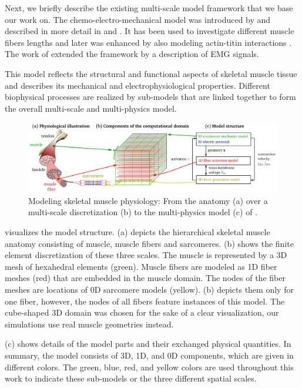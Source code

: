 Next, we briefly describe the existing multi-scale model framework that we base our work on.
The chemo-electro-mechanical model was introduced by \cite{Roehrle2012} and described in more detail in \cite{Heidlauf2013} and \cite{Heidlauf2015Diss}. It has been used to investigate different muscle fibers lengths \cite{Heidlauf2014} and later was enhanced by also modeling actin-titin interactions \cite{Heidlauf2016}. The work of \cite{Mordhorst2015} extended the framework by a description of EMG signals.

This model reflects the structural and functional aspects of skeletal muscle tissue and describes its mechanical and electrophysiological properties. Different biophysical processes are realized by sub-models that are linked together to form the overall multi-scale and multi-physics model.

\begin{figure}
  \centering%
  \includegraphics[width=\textwidth]{images/introduction/model_scheme_overview.pdf}%
  \caption{Modeling skeletal muscle physiology: From the anatomy (a) over a multi-scale discretization (b) to the multi-physics model (c) of \cite{Roehrle2012}.}%
  \label{fig:model_scheme_overview_full}%
\end{figure}%

 visualizes the model structure.  (a) depicts the hierarchical skeletal muscle anatomy consisting of muscle, muscle fibers and sarcomeres.  (b) shows the finite element discretization of these three scales. The muscle is represented by a 3D mesh of hexahedral elements (green). Muscle fibers are modeled as 1D fiber meshes (red) that are embedded in the muscle domain. The nodes of the fiber meshes are locations of 0D sarcomere models (yellow).  (b) depicts them only for one fiber, however, the nodes of all fibers feature instances of this model. The cube-shaped 3D domain was chosen for the sake of a clear visualization, our simulations use real muscle geometries instead.

 (c) shows details of the model parts and their exchanged physical quantities. In summary, the model consists of 3D, 1D, and 0D components, which are given in different colors.
The green, blue, red, and yellow colors are used throughout this work to indicate these sub-models or the three different spatial scales.

